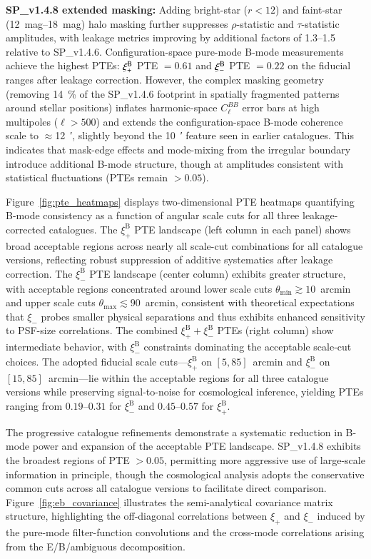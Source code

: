 \documentclass{aa}
\begin{document}
\textbf{SP\_v1.4.8 extended masking:} Adding bright-star ($r < 12$) and faint-star (\SIrange{12}{18}{mag}) halo masking further suppresses $\rho$-statistic and $\tau$-statistic amplitudes, with leakage metrics improving by additional factors of \num{1.3}--\num{1.5} relative to SP\_v1.4.6. Configuration-space pure-mode B-mode measurements achieve the highest PTEs: $\xi_+^{\rm B}$ PTE $= 0.61$ and $\xi_-^{\rm B}$ PTE $= 0.22$ on the fiducial ranges after leakage correction. However, the complex masking geometry (removing \SI{14}{\percent} of the SP\_v1.4.6 footprint in spatially fragmented patterns around stellar positions) inflates harmonic-space $C_\ell^{BB}$ error bars at high multipoles ($\ell > 500$) and extends the configuration-space B-mode coherence scale to $\approx$\SI{12}{\arcmin}, slightly beyond the \SI{10}{\arcmin} feature seen in earlier catalogues. This indicates that mask-edge effects and mode-mixing from the irregular boundary introduce additional B-mode structure, though at amplitudes consistent with statistical fluctuations (PTEs remain $> 0.05$).

Figure~\ref{fig:pte_heatmaps} displays two-dimensional PTE heatmaps quantifying B-mode consistency as a function of angular scale cuts for all three leakage-corrected catalogues. The $\xi_+^{\mathrm{B}}$ PTE landscape (left column in each panel) shows broad acceptable regions across nearly all scale-cut combinations for all catalogue versions, reflecting robust suppression of additive systematics after leakage correction. The $\xi_-^{\mathrm{B}}$ PTE landscape (center column) exhibits greater structure, with acceptable regions concentrated around lower scale cuts $\theta_{\mathrm{min}} \gtrsim 10$~arcmin and upper scale cuts $\theta_{\mathrm{max}} \lesssim 90$~arcmin, consistent with theoretical expectations that $\xi_-$ probes smaller physical separations and thus exhibits enhanced sensitivity to PSF-size correlations. The combined $\xi_+^{\mathrm{B}} + \xi_-^{\mathrm{B}}$ PTEs (right column) show intermediate behavior, with $\xi_-^{\mathrm{B}}$ constraints dominating the acceptable scale-cut choices. The adopted fiducial scale cuts—$\xi_+^{\mathrm{B}}$ on $[5, 85]$~arcmin and $\xi_-^{\mathrm{B}}$ on $[15, 85]$~arcmin—lie within the acceptable regions for all three catalogue versions while preserving signal-to-noise for cosmological inference, yielding PTEs ranging from $0.19$--$0.31$ for $\xi_-^{\mathrm{B}}$ and $0.45$--$0.57$ for $\xi_+^{\mathrm{B}}$.

The progressive catalogue refinements demonstrate a systematic reduction in B-mode power and expansion of the acceptable PTE landscape. SP\_v1.4.8 exhibits the broadest regions of PTE $> 0.05$, permitting more aggressive use of large-scale information in principle, though the cosmological analysis \citep{goh.etal25} adopts the conservative common cuts across all catalogue versions to facilitate direct comparison. Figure~\ref{fig:eb_covariance} illustrates the semi-analytical covariance matrix structure, highlighting the off-diagonal correlations between $\xi_+$ and $\xi_-$ induced by the pure-mode filter-function convolutions and the cross-mode correlations arising from the E/B/ambiguous decomposition.
\end{document}
